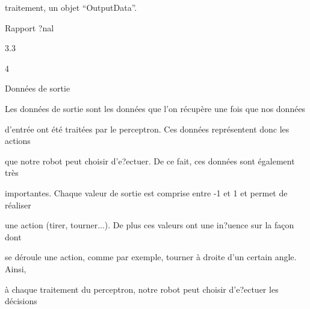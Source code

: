 \documentclass[a4paper,portrait,12pt]{article}
\begin{document}
\begin{flushleft}
traitement, un objet {``}OutputData''.
\end{flushleft}





\begin{flushleft}
\newpage
Rapport ?nal
\end{flushleft}


3.3





4





\begin{flushleft}
Donn\'{e}es de sortie
\end{flushleft}





\begin{flushleft}
Les donn\'{e}es de sortie sont les donn\'{e}es que l'on r\'{e}cup\`{e}re une fois que nos donn\'{e}es
\end{flushleft}


\begin{flushleft}
d'entr\'{e}e ont \'{e}t\'{e} trait\'{e}es par le perceptron. Ces donn\'{e}es repr\'{e}sentent donc les actions
\end{flushleft}


\begin{flushleft}
que notre robot peut choisir d'e?ectuer. De ce fait, ces donn\'{e}es sont \'{e}galement tr\`{e}s
\end{flushleft}


\begin{flushleft}
importantes. Chaque valeur de sortie est comprise entre -1 et 1 et permet de r\'{e}aliser
\end{flushleft}


\begin{flushleft}
une action (tirer, tourner...). De plus ces valeurs ont une in?uence sur la fa\c{c}on dont
\end{flushleft}


\begin{flushleft}
se d\'{e}roule une action, comme par exemple, tourner \`{a} droite d'un certain angle. Ainsi,
\end{flushleft}


\begin{flushleft}
\`{a} chaque traitement du perceptron, notre robot peut choisir d'e?ectuer les d\'{e}cisions
\end{flushleft}
\end{document}
